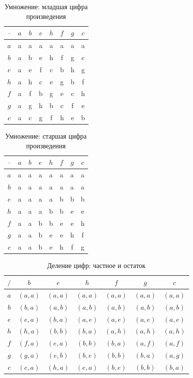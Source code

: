 \documentclass[14pt,a4paper]{extarticle}
\begin{document}
\begin{table}[H]
\caption{Умножение: младшая цифра произведения}\label{tab:mul}
\centering
\begin{tabular}{|c|c|c|c|c|c|c|c|}\hline
$\cdot$ & $a$ & $b$ & $e$ & $h$ & $f$ & $g$ & $c$\\\hline
$a$ & a & a & a & a & a & a & a\\\hline
$b$ & a & b & e & h & f & g & c\\\hline
$e$ & a & e & f & c & b & h & g\\\hline
$h$ & a & h & c & e & g & b & f\\\hline
$f$ & a & f & b & g & e & c & h\\\hline
$g$ & a & g & h & b & c & f & e\\\hline
$c$ & a & c & g & f & h & e & b\\\hline
\end{tabular}
\end{table}

\begin{table}[H]
\caption{Умножение: старшая цифра произведения}\label{tab:mulhi}
\centering
\begin{tabular}{|c|c|c|c|c|c|c|c|}\hline
$\cdot$ & $a$ & $b$ & $e$ & $h$ & $f$ & $g$ & $c$\\\hline
$a$ & a & a & a & a & a & a & a\\\hline
$b$ & a & a & a & a & a & a & a\\\hline
$e$ & a & a & a & a & b & b & b\\\hline
$h$ & a & a & a & b & b & e & e\\\hline
$f$ & a & a & b & b & e & e & h\\\hline
$g$ & a & a & b & e & e & h & f\\\hline
$c$ & a & a & b & e & h & f & g\\\hline
\end{tabular}
\end{table}

\begin{table}[H]
\caption{Деление цифр: частное и остаток}\label{tab:div}
\centering
\begin{tabular}{|c|c|c|c|c|c|c|}\hline
$/ $ & $b$ & $e$ & $h$ & $f$ & $g$ & $c$\\\hline
$a$ & $(a,a)$ & $(a,a)$ & $(a,a)$ & $(a,a)$ & $(a,a)$ & $(a,a)$\\\hline
$b$ & $(b,a)$ & $(a,b)$ & $(a,b)$ & $(a,b)$ & $(a,b)$ & $(a,b)$\\\hline
$e$ & $(e,a)$ & $(b,a)$ & $(a,e)$ & $(a,e)$ & $(a,e)$ & $(a,e)$\\\hline
$h$ & $(h,a)$ & $(b,b)$ & $(b,a)$ & $(a,h)$ & $(a,h)$ & $(a,h)$\\\hline
$f$ & $(f,a)$ & $(e,a)$ & $(b,b)$ & $(b,a)$ & $(a,f)$ & $(a,f)$\\\hline
$g$ & $(g,a)$ & $(e,b)$ & $(b,e)$ & $(b,b)$ & $(b,a)$ & $(a,g)$\\\hline
$c$ & $(c,a)$ & $(h,a)$ & $(e,a)$ & $(b,e)$ & $(b,b)$ & $(b,a)$\\\hline
\end{tabular}
\end{table}
\end{document}
